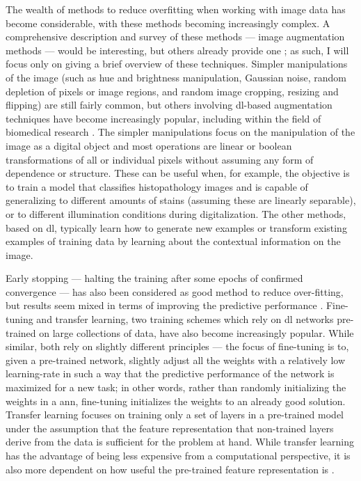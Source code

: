 The wealth of methods to reduce overfitting when working with image data has become considerable, with these methods becoming increasingly complex. A comprehensive description and survey of these methods --- image augmentation methods --- would be interesting, but others already provide one \cite{Shorten2019-hr}; as such, I will focus only on giving a brief overview of these techniques. Simpler manipulations of the image (such as hue and brightness manipulation, Gaussian noise, random depletion of pixels or image regions, and random image cropping, resizing and flipping) are still fairly common, but others involving \ac{dl}-based augmentation techniques have become increasingly popular, including within the field of biomedical research \cite{Shorten2019-hr}. The simpler manipulations focus on the manipulation of the image as a digital object and most operations are linear or boolean transformations of all or individual pixels without assuming any form of dependence or structure. These can be useful when, for example, the objective is to train a model that classifies histopathology images and is capable of generalizing to different amounts of stains (assuming these are linearly separable), or to different illumination conditions during digitalization. The other methods, based on \ac{dl}, typically learn how to generate new examples or transform existing examples of training data by learning about the contextual information on the image.

Early stopping --- halting the training after some epochs of confirmed convergence --- has also been considered as good method to reduce over-fitting, but results seem mixed in terms of improving the predictive performance \cite{Prechelt2012-xf}. Fine-tuning and transfer learning, two training schemes which rely on \ac{dl} networks pre-trained on large collections of data, have also become increasingly popular. While similar, both rely on slightly different principles --- the focus of fine-tuning is to, given a pre-trained network, slightly adjust all the weights with a relatively low learning-rate in such a way that the predictive performance of the network is maximized for a new task; in other words, rather than randomly initializing the weights in a \ac{ann}, fine-tuning initializes the weights to an already good solution. Transfer learning focuses on training only a set of layers in a pre-trained model under the assumption that the feature representation that non-trained layers derive from the data is sufficient for the problem at hand. While transfer learning has the advantage of being less expensive from a computational perspective, it is also more dependent on how useful the pre-trained feature representation is \cite{transfer-learning-fine-tuning}. 

